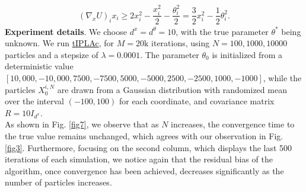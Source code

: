 \documentclass[a4paper, 10pt]{article}
\theoremstyle{plain}%
\begin{document}
\begin{align*}
    \left(\nabla_x U\right)_i x_i\geq 2x^2_i-\dfrac{x_i^2}{2}-\dfrac{\theta_i^2}{2}=\dfrac{3}{2}x_i^2-\dfrac{1}{2}\theta_i^2.
\end{align*}
\noindent \textbf{Experiment details}.
We choose $d^x=d^{\theta} = 10$, with the true parameter $\theta^*$ being unknown. We run \hyperref[algo2]{tIPLAc}, for $M = 20\text{k}$ iterations, using $N = 100, 1000, 10000$ particles and a stepsize of $\lambda = 0.0001$. The parameter ${\theta}_0$ is initialized from a deterministic value $[10,000, -10,000, 7500,-7500,5000,-5000,2500,-2500,1000,-1000]$, while the particles $X^{i,N}_0$ are drawn from a Gaussian distribution with randomized mean over the interval $(-100,100)$ for each coordinate, and covariance matrix $R=10I_{d^x}$.\\
\indent As shown in Fig. \ref{fig7}, we observe that as $N$ increases, the convergence time to the true value remains unchanged, which agrees with our observation in Fig. \ref{fig3}. Furthermore, focusing on the second column, which displays the last 500 iterations of each simulation, we notice again that the residual bias of the algorithm, once convergence has been achieved, decreases significantly as the number of particles increases.
\clearpage
\end{document}
